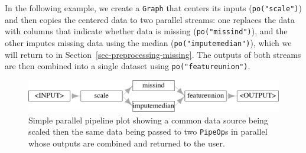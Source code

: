 In the following example, we create a \texttt{Graph} that centers its
inputs (\texttt{po("scale")}) and then copies the centered data to two
parallel streams: one replaces the data with columns that indicate
whether data is missing (\texttt{po("missind")}), and the other imputes
missing data using the median (\texttt{po("imputemedian")}), which we
will return to in Section~\ref{sec-preprocessing-missing}. The outputs
of both streams are then combined into a single dataset using
\texttt{po("featureunion")}.

\begin{Shaded}
\begin{Highlighting}[]

\OtherTok{=} \NormalTok{(}\NormalTok{, } \NormalTok{, } \NormalTok{) }\SpecialCharTok{\%\textgreater{}\textgreater{}\%}
  \NormalTok{(}\NormalTok{(}
    \NormalTok{(}\NormalTok{),}
    \NormalTok{(}\NormalTok{)}
\NormalTok{  )) }\SpecialCharTok{\%\textgreater{}\textgreater{}\%}
  \NormalTok{(}\NormalTok{)}

\SpecialCharTok{$}\NormalTok{(} \NormalTok{)}
\end{Highlighting}
\end{Shaded}

\begin{figure}

{\centering \includegraphics[width=1\textwidth,height=\textheight]{chapters/chapter8/non-sequential_pipelines_and_tuning_files/figure-pdf/fig-pipelines-parallel-plot-1.png}

}

\caption{\label{fig-pipelines-parallel-plot}Simple parallel pipeline
plot showing a common data source being scaled then the same data being
passed to two \texttt{PipeOp}s in parallel whose outputs are combined
and returned to the user.}

\end{figure}

